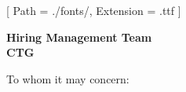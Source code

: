 


\renewcommand{\photo}[2]{}

\ifmonochrome
  \renewcommand{\marginpar}[1]{}
\fi

\geometry{
  left=2cm,
  right=2cm,
  top=2cm,
  bottom=2cm,
  portrait
}

\setmainfont{NotoSans-Regular}[
  Path = ./fonts/,
  Extension = .ttf
]



\makecvheader

\vspace{1cm}
\indent\textbf{Hiring Management Team}\\
\indent\textbf{CTG}

\vspace{0.5cm}

\noindent To whom it may concern:

\vspace{0.5cm}

\justifying

